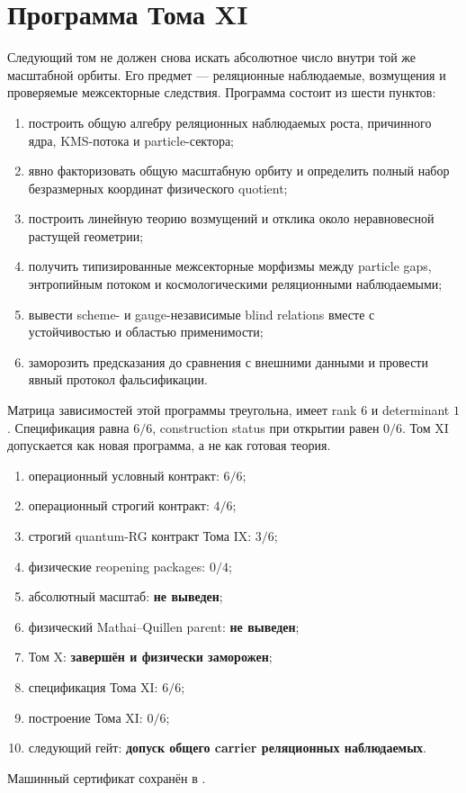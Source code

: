 \section{Программа Тома XI}

Следующий том не должен снова искать абсолютное число внутри той же
масштабной орбиты. Его предмет --- реляционные наблюдаемые, возмущения и
проверяемые межсекторные следствия. Программа состоит из шести пунктов:
\begin{enumerate}
\item построить общую алгебру реляционных наблюдаемых роста, причинного
ядра, KMS-потока и particle-сектора;
\item явно факторизовать общую масштабную орбиту и определить полный набор
безразмерных координат физического quotient;
\item построить линейную теорию возмущений и отклика около неравновесной
растущей геометрии;
\item получить типизированные межсекторные морфизмы между particle gaps,
энтропийным потоком и космологическими реляционными наблюдаемыми;
\item вывести scheme- и gauge-независимые blind relations вместе с
устойчивостью и областью применимости;
\item заморозить предсказания до сравнения с внешними данными и провести
явный протокол фальсификации.
\end{enumerate}

Матрица зависимостей этой программы треугольна, имеет rank $6$ и
determinant $1$. Спецификация равна $6/6$, construction status при открытии
равен $0/6$. Том XI допускается как новая программа, а не как готовая
теория.

\begin{protocol}\begin{enumerate}
\item операционный условный контракт: \textbf{$6/6$};
\item операционный строгий контракт: \textbf{$4/6$};
\item строгий quantum-RG контракт Тома IX: \textbf{$3/6$};
\item физические reopening packages: \textbf{$0/4$};
\item абсолютный масштаб: \textbf{не выведен};
\item физический Mathai--Quillen parent: \textbf{не выведен};
\item Том X: \textbf{завершён и физически заморожен};
\item спецификация Тома XI: \textbf{$6/6$};
\item построение Тома XI: \textbf{$0/6$};
\item следующий гейт: \textbf{допуск общего carrier реляционных наблюдаемых}.
\end{enumerate}\end{protocol}

Машинный сертификат сохранён в
.